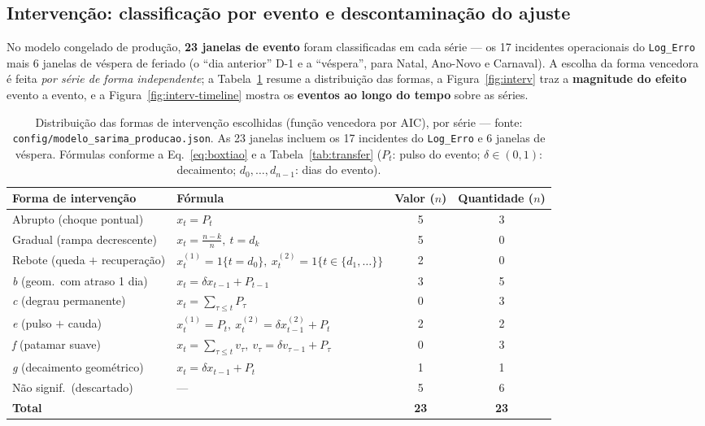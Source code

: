 \documentclass[11pt,a4paper]{article}
\begin{document}
\subsection{Intervenção: classificação por evento e descontaminação do ajuste}
\label{sec:res-interv}

No modelo congelado de produção, \textbf{23 janelas de evento} foram classificadas em cada série
--- os 17 incidentes operacionais do \texttt{Log\_Erro} mais 6 janelas de véspera de feriado (o
``dia anterior'' D-1 e a ``véspera'', para Natal, Ano-Novo e Carnaval). A escolha da forma
vencedora é feita \emph{por série de forma independente}; a Tabela~\ref{tab:efeitos} resume a
distribuição das formas, a Figura~\ref{fig:interv} traz a \textbf{magnitude do efeito} evento a
evento, e a Figura~\ref{fig:interv-timeline} mostra os \textbf{eventos ao longo do tempo} sobre as
séries.

\begin{table}[H]
\centering
\caption{Distribuição das formas de intervenção escolhidas (função vencedora por AIC), por série
--- fonte: \texttt{config/modelo\_sarima\_producao.json}. As 23 janelas incluem os 17 incidentes
do \texttt{Log\_Erro} e 6 janelas de véspera. Fórmulas conforme a Eq.~\eqref{eq:boxtiao} e a
Tabela~\ref{tab:transfer} ($P_t$: pulso do evento; $\delta\in(0,1)$: decaimento; $d_0,\dots,d_{n-1}$:
dias do evento).}
\label{tab:efeitos}
\small
\renewcommand{\arraystretch}{1.35}
\begin{tabular}{@{}lp{5.3cm}cc@{}}
\toprule
Forma de intervenção & \textbf{Fórmula} & \textbf{Valor} ($n$) & \textbf{Quantidade} ($n$) \\
\midrule
Abrupto (choque pontual)          & $x_t = P_t$ & 5 & 3 \\
Gradual (rampa decrescente)       & $x_t = \tfrac{n-k}{n},\ t=d_k$ & 5 & 0 \\
Rebote (queda $+$ recuperação)    & $x^{(1)}_t=1\{t=d_0\},\ x^{(2)}_t=1\{t\in\{d_1,\dots\}\}$ & 2 & 0 \\
\emph{b} (geom.\ com atraso 1 dia)& $x_t=\delta x_{t-1}+P_{t-1}$ & 3 & 5 \\
\emph{c} (degrau permanente)      & $x_t=\sum_{\tau\le t}P_\tau$ & 0 & 3 \\
\emph{e} (pulso $+$ cauda)        & $x^{(1)}_t=P_t,\ x^{(2)}_t=\delta x^{(2)}_{t-1}+P_t$ & 2 & 2 \\
\emph{f} (patamar suave)          & $x_t=\sum_{\tau\le t}v_\tau,\ v_\tau=\delta v_{\tau-1}+P_\tau$ & 0 & 3 \\
\emph{g} (decaimento geométrico)  & $x_t=\delta x_{t-1}+P_t$ & 1 & 1 \\
Não signif.\ (descartado)         & --- & 5 & 6 \\
\midrule
\textbf{Total}                    & & \textbf{23} & \textbf{23} \\
\bottomrule
\end{tabular}
\end{table}
\end{document}
